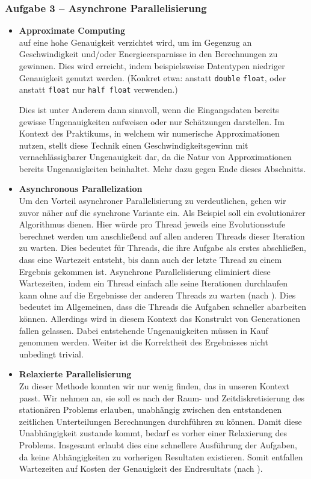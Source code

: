 \documentclass[german,notes,18pt]{beamer}
\begin{document}
	\begin{frame}
		\frametitle{Aufgabe 3 -- Asynchrone Parallelisierung}
		\begin{itemize}
			\item \textbf{Approximate Computing} \\
			auf eine hohe Genauigkeit verzichtet wird, um im Gegenzug an Geschwindigkeit und/oder Energieersparnisse in den Berechnungen zu gewinnen. Dies wird erreicht, indem beispielsweise Datentypen niedriger Genauigkeit genutzt werden. (Konkret etwa: anstatt \texttt{double} \texttt{float}, oder anstatt \texttt{float} nur \texttt{half float} verwenden.)
			
			Dies ist unter Anderem dann sinnvoll, wenn die Eingangsdaten bereits gewisse Ungenauigkeiten aufweisen oder nur Schätzungen darstellen. Im Kontext des Praktikums, in welchem wir numerische Approximationen nutzen, stellt diese Technik einen Geschwindigkeitsgewinn mit vernachlässigbarer Ungenauigkeit dar, da die Natur von Approximationen bereits Ungenauigkeiten beinhaltet. Mehr dazu gegen Ende dieses Abschnitts.
			
			\item \textbf{Asynchronous Parallelization} \\
			Um den Vorteil asynchroner Parallelisierung zu verdeutlichen, gehen wir zuvor näher auf die synchrone Variante ein. Als Beispiel soll ein evolutionärer Algorithmus dienen. Hier würde pro Thread jeweils eine Evolutionsstufe berechnet werden um anschließend auf allen anderen Threads dieser Iteration zu warten. Dies bedeutet für Threads, die ihre Aufgabe als erstes abschließen, dass eine Wartezeit entsteht, bis dann auch der letzte Thread zu einem Ergebnis gekommen ist. Asynchrone Parallelisierung eliminiert diese Wartezeiten, indem ein Thread einfach alle seine Iterationen durchlaufen kann ohne auf die Ergebnisse der anderen Threads zu warten (nach \cite{CompAsyncSync}). Dies bedeutet im Allgemeinen, dass die Threads die Aufgaben schneller abarbeiten können. Allerdings wird in diesem Kontext das Konstrukt von Generationen fallen gelassen. Dabei entstehende Ungenauigkeiten müssen in Kauf genommen werden. Weiter ist die Korrektheit des Ergebnisses nicht unbedingt trivial.
			
			\item \textbf{Relaxierte Parallelisierung} \\
			Zu dieser Methode konnten wir nur wenig finden, das in unseren Kontext passt. Wir nehmen an, sie soll es nach der Raum- und Zeitdiskretisierung des stationären Problems erlauben, unabhängig zwischen den entstandenen zeitlichen Unterteilungen Berechnungen durchführen zu können. Damit diese Unabhängigkeit zustande kommt, bedarf es vorher einer Relaxierung des Problems. Insgesamt erlaubt dies eine schnellere Ausführung der Aufgaben, da keine Abhängigkeiten zu vorherigen Resultaten existieren. Somit entfallen Wartezeiten auf Kosten der Genauigkeit des Endresultats (nach \cite{HighOrder}).
		\end{itemize}
	\end{frame}
\end{document}
